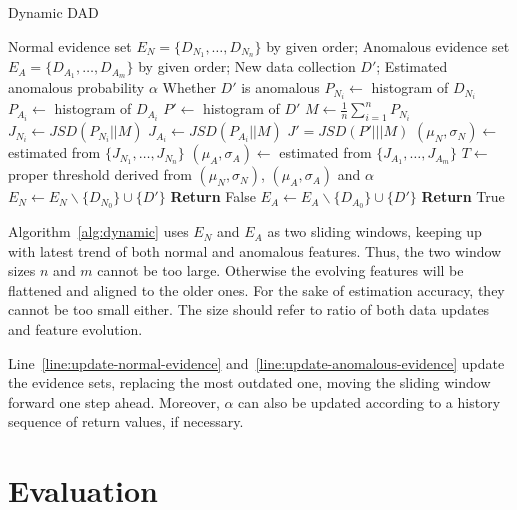 \documentclass[a4paper]{IEEEtran}
\begin{document}
			\begin{algorithm}[!ht]
				\caption{Dynamic DAD}
				\label{alg:dynamic}
				\begin{algorithmic}[1]
					\Require Normal evidence set $E_N = \{D_{N_1}, \dots, D_{N_n}\}$ by given order; Anomalous evidence set $E_A = \{D_{A_1}, \dots, D_{A_m}\}$ by given order; New data collection $D'$; Estimated anomalous probability $\alpha$
					\Ensure Whether $D'$ is anomalous
						\State $P_{N_i} \gets$ histogram of $D_{N_i}$
					\EndFor
						\State $P_{A_i} \gets$ histogram of $D_{A_i}$
					\EndFor
					\State $P' \gets$ histogram of $D'$
					\State $M \gets \frac{1}{n}\sum_{i=1}^{n}P_{N_i}$
						\State $J_{N_i} \gets JSD(P_{N_i}||M)$
					\EndFor
						\State $J_{A_i} \gets JSD(P_{A_i}||M)$
					\EndFor
					\State $J' = JSD(P'|||M)$
					\State $(\mu_N, \sigma_N) \gets$ estimated from $\{J_{N_1}, \dots, J_{N_n}\}$
					\State $(\mu_A, \sigma_A) \gets$ estimated from $\{J_{A_1}, \dots, J_{A_m}\}$
					\State $T \gets$ proper threshold derived from $(\mu_N, \sigma_N)$, $(\mu_A, \sigma_A)$ and $\alpha$
						\State $E_N \gets E_N \backslash \{D_{N_0}\} \cup \{D'\}$\label{line:update-normal-evidence}
						\State \textbf{Return} False
					\Else
						\State $E_A \gets E_A \backslash \{D_{A_0}\} \cup \{D'\}$\label{line:update-anomalous-evidence}
						\State \textbf{Return} True
					\EndIf
				\end{algorithmic}
			\end{algorithm}
			
			Algorithm~\ref{alg:dynamic} uses $E_N$ and $E_A$ as two sliding windows, keeping up with latest trend of both normal and anomalous features. Thus, the two window sizes $n$ and $m$ cannot be too large. Otherwise the evolving features will be flattened and aligned to the older ones. For the sake of estimation accuracy, they cannot be too small either. The size should refer to ratio of both data updates and feature evolution.
			
			Line~\ref{line:update-normal-evidence} and~\ref{line:update-anomalous-evidence} update the evidence sets, replacing the most outdated one, moving the sliding window forward one step ahead. Moreover, $\alpha$ can also be updated according to a history sequence of return values, if necessary.
	
	\section{Evaluation}\label{sec:evaluation}
\end{document}
